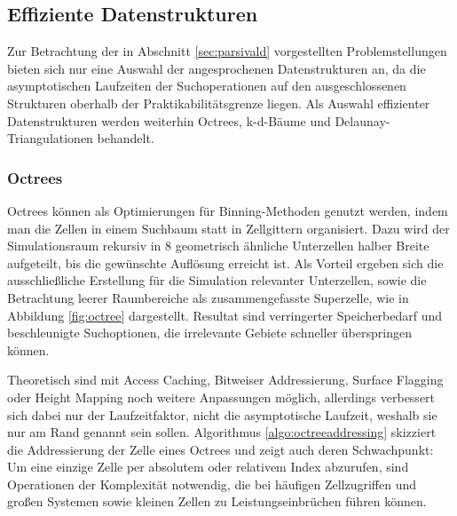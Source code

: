 
\subsection{Effiziente Datenstrukturen}

Zur Betrachtung der in Abschnitt \ref{sec:parsivald} vorgestellten Problemstellungen bieten sich nur eine Auswahl der angesprochenen Datenstrukturen an, da die asymptotischen Laufzeiten der Suchoperationen auf den ausgeschlossenen Strukturen oberhalb der Praktikabilitätsgrenze liegen.
Als Auswahl effizienter Datenstrukturen werden weiterhin Octrees, k-d-Bäume und Delaunay-Triangulationen behandelt.

\subsubsection{Octrees}\label{dataoctree}
Octrees können als Optimierungen für Binning-Methoden genutzt werden, indem man die Zellen in einem Suchbaum statt in Zellgittern organisiert.
Dazu wird der Simulationsraum rekursiv in 8 geometrisch ähnliche Unterzellen halber Breite aufgeteilt, bis die gewünschte Auflösung erreicht ist.
Als Vorteil ergeben sich die ausschließliche Erstellung für die Simulation relevanter Unterzellen, sowie die Betrachtung leerer Raumbereiche als zusammengefasste Superzelle, wie in Abbildung \ref{fig:octree} dargestellt.
Resultat sind verringerter Speicherbedarf und beschleunigte Suchoptionen, die irrelevante Gebiete schneller überspringen können.

Theoretisch sind mit Access Caching, Bitweiser Addressierung, Surface Flagging oder Height Mapping noch weitere Anpassungen möglich, allerdings verbessert sich dabei nur der Laufzeitfaktor, nicht die asymptotische Laufzeit, weshalb sie nur am Rand genannt sein sollen.
Algorithmus \ref{algo:octreeaddressing} skizziert die Addressierung der Zelle eines Octrees und zeigt auch deren Schwachpunkt:
Um eine einzige Zelle per absolutem oder relativem Index abzurufen, sind Operationen der Komplexität  notwendig, die bei häufigen Zellzugriffen und großen Systemen sowie kleinen Zellen zu Leistungseinbrüchen führen können.


